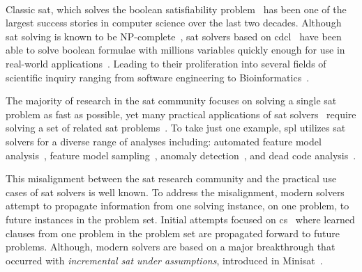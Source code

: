 ~\label{chap:introduction}


Classic \ac{sat}, which solves the boolean satisfiability
problem~\cite{10.5555/1550723} has been one of the largest success stories in
computer science over the last two decades. Although \ac{sat} solving is known
to be NP-complete~\cite{10.1145/800157.805047}, \ac{sat} solvers based on
\ac{cdcl}~\cite{Marques-Silva:1999:GSA:304491.304506,Silva:1997:GNS:244522.244560,10.5555/1867406.1867438}
have been able to solve boolean formulae with millions variables quickly enough
for use in real-world applications~\cite{10.5555/1557461}. Leading to their
proliferation into several fields of scientific inquiry ranging from software
engineering to
Bioinformatics~\cite{10.1007/11814948_16,10.1007/978-3-642-31612-8_12}.

The majority of research in the \ac{sat} community focuses on solving a single
\ac{sat} problem as fast as possible, yet many practical applications of
\ac{sat}
solvers~\cite{silva1997robust,10.1007/3-540-44798-9_4,10.1145/378239.379019,10.1145/1698759.1698762,Een_asingle-instance,een2003temporal,10.5555/1998496.1998520}
require solving a set of related \ac{sat}
problems~\cite{10.1007/3-540-44798-9_4, silva1997robust, een2003temporal}. To
take just one example, \ac{spl} utilizes \ac{sat} solvers for a diverse range of
analyses including: automated feature model
analysis~\cite{useBTRC05,GBT+19,TAK+:CSUR14}, feature model
sampling~\cite{MKR+:ICSE16,VAT+:SPLC18}, anomaly
detection~\cite{AKTS:FOSD16,KAT:TR16,MNS+:SPLC17}, and dead code
analysis~\cite{TLSS:EuroSys11}.

This misalignment between the \ac{sat} research community and the practical use
cases of \ac{sat} solvers is well known. To address the misalignment, modern
solvers attempt to propagate information from one solving instance, on one
problem, to future instances in the problem set. Initial attempts focused on
\ac{cs}~\cite{10.1007/3-540-44798-9_4,10.1145/378239.379019} where learned
clauses from one problem in the problem set are propagated forward to future
problems. Although, modern solvers are based on a major breakthrough that
occurred with \emph{incremental \ac{sat} under assumptions}, introduced in
Minisat~\cite{10.1007/978-3-540-24605-3_37}.

